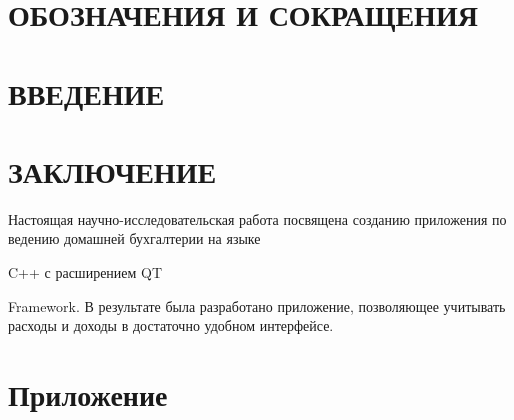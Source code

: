 \documentclass[a4paper,12pt]{article}
\begin{document}
\pagebreak
\thispagestyle{empty}


\section*{\centering ОБОЗНАЧЕНИЯ И СОКРАЩЕНИЯ}


\pagebreak



\tableofcontents

\pagebreak

\section*{\centering ВВЕДЕНИЕ}
\pagebreak

%
\pagebreak
\pagebreak
\pagebreak


\pagebreak
\section*{\centering ЗАКЛЮЧЕНИЕ}
Настоящая научно-исследовательская работа посвящена созданию приложения по ведению домашней бухгалтерии на языке

C++ с расширением QT

Framework. В результате была разработано приложение, позволяющее учитывать расходы и доходы в достаточно удобном интерфейсе.

\pagebreak
\nocite{qtdoc}
\nocite{qt532015}
\nocite{Warren2007}
\printbibliography

\pagebreak
\section*{\centering Приложение}
\end{document}
